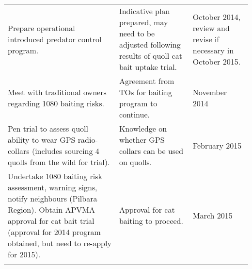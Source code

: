 \documentclass[version=last,
    paper=a4,                               %
    10pt,                                   %
    dvipsnames,
    oneside,                              %
    headings=openany,                       %
    open=any,
    BCOR=7mm,                               %
    DIV=15,     %
]{scrbook}
\begin{document}
\begin{longtable}[]{@{}lll@{}}
\begin{minipage}[t]{0.30\columnwidth}
Prepare operational introduced predator control program.\strut
\end{minipage} & \begin{minipage}[t]{0.30\columnwidth}\raggedright
Indicative plan prepared, may need to be adjusted following results of
quoll cat bait uptake trial.\strut
\end{minipage} & \begin{minipage}[t]{0.30\columnwidth}\raggedright
October 2014, review and revise if necessary in October 2015.\strut
\end{minipage}\tabularnewline
\begin{minipage}[t]{0.30\columnwidth}\raggedright
Meet with traditional owners regarding 1080 baiting risks.\strut
\end{minipage} & \begin{minipage}[t]{0.30\columnwidth}\raggedright
Agreement from TOs for baiting program to continue.\strut
\end{minipage} & \begin{minipage}[t]{0.30\columnwidth}\raggedright
November 2014\strut
\end{minipage}\tabularnewline
\begin{minipage}[t]{0.30\columnwidth}\raggedright
Pen trial to assess quoll ability to wear GPS radio-collars (includes
sourcing 4 quolls from the wild for trial).\strut
\end{minipage} & \begin{minipage}[t]{0.30\columnwidth}\raggedright
Knowledge on whether GPS collars can be used on quolls.\strut
\end{minipage} & \begin{minipage}[t]{0.30\columnwidth}\raggedright
February 2015\strut
\end{minipage}\tabularnewline
\begin{minipage}[t]{0.30\columnwidth}\raggedright
Undertake 1080 baiting risk assessment, warning signs, notify neighbours
(Pilbara Region). Obtain APVMA approval for cat bait trial (approval for
2014 program obtained, but need to re-apply for 2015).\strut
\end{minipage} & \begin{minipage}[t]{0.30\columnwidth}\raggedright
Approval for cat baiting to proceed.\strut
\end{minipage} & \begin{minipage}[t]{0.30\columnwidth}\raggedright
March 2015\strut
\end{minipage}\tabularnewline
\begin{minipage}[t]{0.30\columnwidth}\raggedright

\end{minipage}
\end{longtable}
\end{document}
